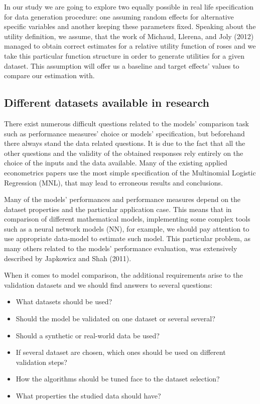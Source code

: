 \documentclass[12pt,]{article}
\providecommand{\tightlist}{%
  \setlength{\itemsep}{0pt}\setlength{\parskip}{0pt}}
\begin{document}
In our study we are going to explore two equally possible in real life
specification for data generation procedure: one assuming random effects
for alternative specific variables and another keeping these parameters
fixed. Speaking about the utility definition, we assume, that the work
of Michaud, Llerena, and Joly (2012) managed to obtain correct estimates
for a relative utility function of roses and we take this particular
function structure in order to generate utilities for a given dataset.
This assumption will offer us a baseline and target effects' values to
compare our estimation with.

\hypertarget{different-datasets-available-in-research}{%
\subsection{Different datasets available in
research}\label{different-datasets-available-in-research}}

There exist numerous difficult questions related to the models'
comparison task such as performance measures' choice or models'
specification, but beforehand there always stand the data related
questions. It is due to the fact that all the other questions and the
validity of the obtained responses rely entirely on the choice of the
inputs and the data available. Many of the existing applied econometrics
papers use the most simple specification of the Multinomial Logistic
Regression (MNL), that may lead to erroneous results and conclusions.

Many of the models' performances and performance measures depend on the
dataset properties and the particular application case. This means that
in comparison of different mathematical models, implementing some
complex tools such as a neural network models (NN), for example, we
should pay attention to use appropriate data-model to estimate such
model. This particular problem, as many others related to the models'
performance evaluation, was extensively described by Japkowicz and Shah
(2011).

When it comes to model comparison, the additional requirements arise to
the validation datasets and we should find answers to several questions:

\begin{itemize}
\tightlist
\item
  What datasets should be used?
\item
  Should the model be validated on one dataset or several several?
\item
  Should a synthetic or real-world data be used?
\item
  If several dataset are chosen, which ones should be used on different
  validation steps?
\item
  How the algorithms should be tuned face to the dataset selection?
\item
  What properties the studied data should have?
\end{itemize}
\end{document}
